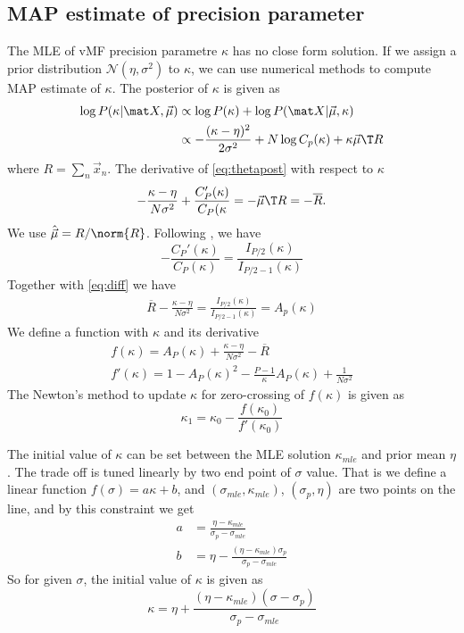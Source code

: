 \documentclass{article}
\begin{document}
\subsection{MAP estimate of precision parameter}
The MLE of vMF precision parametre $\kappa$ has no close form solution. If we assign a prior distribution $\mathcal{N}(\eta, \sigma^2)$ to $\kappa$, we can use numerical methods to compute MAP estimate of $\kappa$. The posterior of $\kappa$ is given as
\begin{align}
  \log P(\kappa | \mat X, \vec \mu) &\propto \log P(\kappa) + \log P(\mat X | \vec \mu, \kappa) \nonumber\\
  &\propto - \frac{(\kappa - \eta)^2}{2\sigma^2}  + N \log C_p(\kappa) + \kappa \vec \mu\T R \label{eq:thetapost}
\end{align}
where $R = \sum_n \vec x_n$. The derivative of \eqref{eq:thetapost} with respect to $\kappa$ 
\begin{align}
  - \frac{\kappa - \eta}{N\sigma^2} + \frac{C_P'(\kappa)}{C_P(\kappa} = -\vec \mu\T R = - \overline{R}. \label{eq:diff}
\end{align}
We use $\hat {\vec \mu} = R / \norm{R}$. Following \cite{banerjee2006clustering}, we have
\begin{equation*}
  - \frac{C_P'(\kappa)}{C_P(\kappa)} = \frac{I_{P/2}(\kappa)}{I_{P/2-1}(\kappa)}
\end{equation*}
Together with \eqref{eq:diff} we have 
\begin{align*}
  \overline{R} - \frac{\kappa - \eta}{N \sigma^2} = \frac{I_{P/2}(\kappa)}{I_{P/2-1}(\kappa)} = A_p(\kappa)
\end{align*}
We define a function with $\kappa$ and its derivative
\begin{align*}
  f(\kappa) = A_P(\kappa) + \frac{\kappa - \eta}{N \sigma^2} - \overline{R}\\
  f'(\kappa) = 1 - A_P(\kappa)^2 - \frac{P-1}{\kappa} A_P(\kappa) + \frac{1}{N\sigma^2}
\end{align*}
The Newton's method to update $\kappa$ for zero-crossing of $f(\kappa)$ is given as
\begin{equation*}
  \kappa_1 = \kappa_0 - \frac{f(\kappa_0)}{f'(\kappa_0)}
\end{equation*}


The initial value of $\kappa$ can be set between the MLE solution $\kappa_{mle}$ and prior mean $\eta$. The trade off is tuned linearly by two end point of $\sigma$ value. That is we define a linear function $f(\sigma) = a \kappa + b$, and $(\sigma_{mle}, \kappa_{mle})$, $(\sigma_p, \eta)$ are two points on the line, and by this constraint we get 
\begin{align*}
  a &= \frac{\eta - \kappa_{mle}}{\sigma_p - \sigma_{mle}}\\
  b &= \eta - \frac{(\eta - \kappa_{mle}) \sigma_p}{\sigma_p - \sigma_{mle}}
\end{align*}
So for given $\sigma$, the initial value of $\kappa$ is given as
\begin{equation*}
  \kappa = \eta + \frac{(\eta - \kappa_{mle}) (\sigma - \sigma_p)}{\sigma_p - \sigma_{mle}}
\end{equation*}
\end{document}
